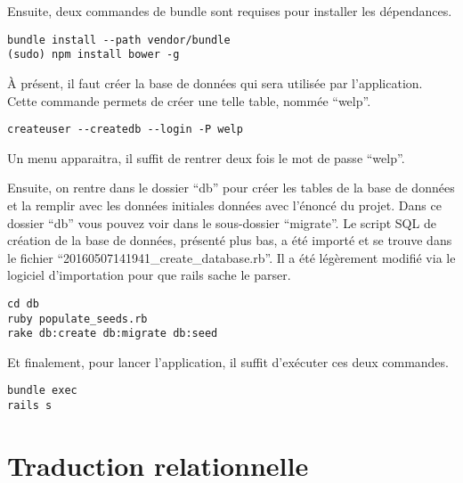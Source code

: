 \documentclass[a4paper,10pt]{article}
\begin{document}
Ensuite, deux commandes de bundle sont requises pour installer les dépendances.

\begin{verbatim}
bundle install --path vendor/bundle
(sudo) npm install bower -g
\end{verbatim}

À présent, il faut créer la base de données qui sera utilisée par l'application. Cette commande permets de créer une telle table, nommée ``welp''.

\begin{verbatim}
createuser --createdb --login -P welp
\end{verbatim}

Un menu apparaitra, il suffit de rentrer deux fois le mot de passe ``welp''.

Ensuite, on rentre dans le dossier ``db'' pour créer les tables de la base de données et la remplir avec les données initiales données avec l'énoncé du projet. Dans ce dossier ``db'' vous pouvez voir dans le sous-dossier ``migrate''. Le script SQL de création de la base de données, présenté plus bas, a été importé et se trouve dans le fichier ``20160507141941\_create\_database.rb''. Il a été légèrement modifié via le logiciel d'importation pour que rails sache le parser.

\begin{verbatim}
cd db
ruby populate_seeds.rb
rake db:create db:migrate db:seed
\end{verbatim}

Et finalement, pour lancer l'application, il suffit d'exécuter ces deux commandes.

\begin{verbatim}
bundle exec
rails s
\end{verbatim}

\begin{landscape}



\end{landscape}

\section{Traduction relationnelle}
\end{document}
